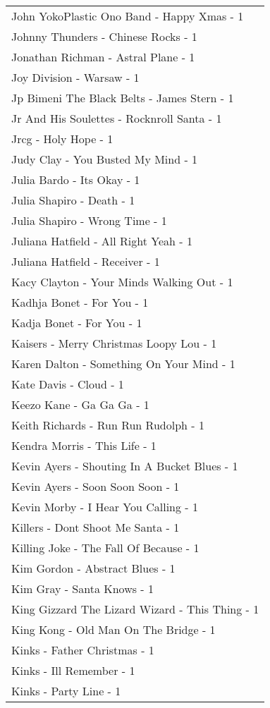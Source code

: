 \documentclass[
]{article}
\begin{document}
\begin{longtable}{l}
John YokoPlastic Ono Band - Happy Xmas - 1 \\ 
Johnny Thunders - Chinese Rocks - 1 \\ 
Jonathan Richman - Astral Plane - 1 \\ 
Joy Division - Warsaw - 1 \\ 
Jp Bimeni The Black Belts - James Stern - 1 \\ 
Jr And His Soulettes - Rocknroll Santa - 1 \\ 
Jrcg - Holy Hope - 1 \\ 
Judy Clay - You Busted My Mind - 1 \\ 
Julia Bardo - Its Okay - 1 \\ 
Julia Shapiro - Death - 1 \\ 
Julia Shapiro - Wrong Time - 1 \\ 
Juliana Hatfield - All Right Yeah - 1 \\ 
Juliana Hatfield - Receiver - 1 \\ 
Kacy Clayton - Your Minds Walking Out - 1 \\ 
Kadhja Bonet - For You - 1 \\ 
Kadja Bonet - For You - 1 \\ 
Kaisers - Merry Christmas Loopy Lou - 1 \\ 
Karen Dalton - Something On Your Mind - 1 \\ 
Kate Davis - Cloud - 1 \\ 
Keezo Kane - Ga Ga Ga - 1 \\ 
Keith Richards - Run Run Rudolph - 1 \\ 
Kendra Morris - This Life - 1 \\ 
Kevin Ayers - Shouting In A Bucket Blues - 1 \\ 
Kevin Ayers - Soon Soon Soon - 1 \\ 
Kevin Morby - I Hear You Calling - 1 \\ 
Killers - Dont Shoot Me Santa - 1 \\ 
Killing Joke - The Fall Of Because - 1 \\ 
Kim Gordon - Abstract Blues - 1 \\ 
Kim Gray - Santa Knows - 1 \\ 
King Gizzard The Lizard Wizard - This Thing - 1 \\ 
King Kong - Old Man On The Bridge - 1 \\ 
Kinks - Father Christmas - 1 \\ 
Kinks - Ill Remember - 1 \\ 
Kinks - Party Line - 1 \\ 

\end{longtable}
\end{document}
